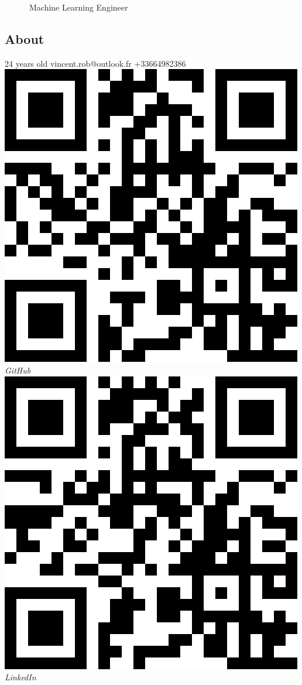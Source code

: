 \documentclass[]{source}
\begin{document}
{~~~~~~Machine Learning Engineer}

\begin{aside}
\section{About}
\vspace{0.65cm}
24 years old
vincent.rob@outlook.fr
+33664982386
\vspace{0.5cm}
\includegraphics[scale=0.18]{github.png}
\textit{GitHub}
\vspace{0.4cm}
\includegraphics[scale=0.18]{linked_in.png}
\textit{LinkedIn}

\end{aside}
\end{document}
